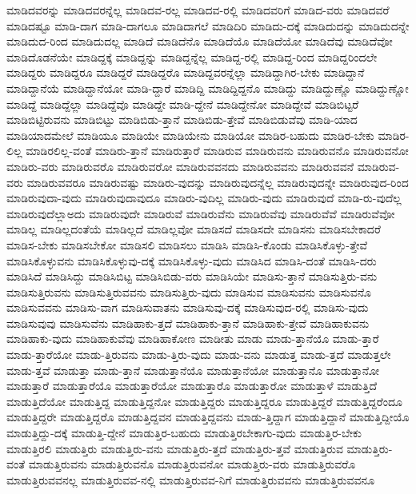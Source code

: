 {ಮಾಡಿದವರನ್ನು
ಮಾಡಿದವರನ್ನೆಲ್ಲ
ಮಾಡಿದವ-ರಲ್ಲ
ಮಾಡಿದವ-ರಲ್ಲಿ
ಮಾಡಿದವರಿಗೆ
ಮಾಡಿದ-ವರು
ಮಾಡಿದವರೆ
ಮಾಡಿದಷ್ಟೂ
ಮಾಡಿ-ದಾಗ
ಮಾಡಿ-ದಾಗಲೂ
ಮಾಡಿದಾಗಲೆ
ಮಾಡಿದಿರಿ
ಮಾಡಿದು-ದಕ್ಕೆ
ಮಾಡಿದುದನ್ನು
ಮಾಡಿದುದನ್ನೇ
ಮಾಡಿದುದ-ರಿಂದ
ಮಾಡಿದುದಲ್ಲ
ಮಾಡಿದೆ
ಮಾಡಿದೆನೊ
ಮಾಡಿದೆಯೊ
ಮಾಡಿದೆಯೋ
ಮಾಡಿದೆವು
ಮಾಡಿದೆವೋ
ಮಾಡಿದೊಡನೆಯೇ
ಮಾಡಿದ್ದಕ್ಕೆ
ಮಾಡಿದ್ದನ್ನು
ಮಾಡಿದ್ದನ್ನೆಲ್ಲ
ಮಾಡಿದ್ದ-ರಲ್ಲಿ
ಮಾಡಿದ್ದ-ರಿಂದ
ಮಾಡಿದ್ದರಿಂದಲೇ
ಮಾಡಿದ್ದರು
ಮಾಡಿದ್ದರೂ
ಮಾಡಿದ್ದರೆ
ಮಾಡಿದ್ದರೊ
ಮಾಡಿದ್ದವರನ್ನೆಲ್ಲಾ
ಮಾಡಿದ್ದಾಗಿರ-ಬೇಕು
ಮಾಡಿದ್ದಾನೆ
ಮಾಡಿದ್ದಾನೆಯೆ
ಮಾಡಿದ್ದಾನೆಯೋ
ಮಾಡಿ-ದ್ದಾರೆ
ಮಾಡಿದ್ದಿ
ಮಾಡಿದ್ದಿದ್ದನೊ
ಮಾಡಿದ್ದು
ಮಾಡಿದ್ದುಣ್ಣೊ
ಮಾಡಿದ್ದುಣ್ಣೋ
ಮಾಡಿದ್ದೆ
ಮಾಡಿದ್ದೆಲ್ಲಾ
ಮಾಡಿದ್ದೆವೊ
ಮಾಡಿದ್ದೇ
ಮಾಡಿ-ದ್ದೇನೆ
ಮಾಡಿದ್ದೇನೋ
ಮಾಡಿದ್ದೇವೆ
ಮಾಡಿಬಿಟ್ಟರೆ
ಮಾಡಿಬಿಟ್ಟಿರುವನು
ಮಾಡಿಬಿಟ್ಟು
ಮಾಡಿಬಿಡು-ತ್ತಾನೆ
ಮಾಡಿಬಿಡು-ತ್ತೇವೆ
ಮಾಡಿಬಿಡುವೆವು
ಮಾಡಿ-ಯಾದ
ಮಾಡಿಯಾದಮೇಲೆ
ಮಾಡಿಯೂ
ಮಾಡಿಯೇ
ಮಾಡಿಯೇನು
ಮಾಡಿಯೋ
ಮಾಡಿರ-ಬಹುದು
ಮಾಡಿರ-ಬೇಕು
ಮಾಡಿರ-ಲಿಲ್ಲ
ಮಾಡಿರಲಿಲ್ಲ-ವಂತೆ
ಮಾಡಿರು-ತ್ತಾನೆ
ಮಾಡಿರುತ್ತಾರೆ
ಮಾಡಿರುವ
ಮಾಡಿರುವನು
ಮಾಡಿರುವನೊ
ಮಾಡಿರುವನೋ
ಮಾಡಿರು-ವರು
ಮಾಡಿರುವರೊ
ಮಾಡಿರುವರೋ
ಮಾಡಿರುವವನದು
ಮಾಡಿರುವವನು
ಮಾಡಿರುವವನೆ
ಮಾಡಿರುವ-ವರು
ಮಾಡಿರುವವರೂ
ಮಾಡಿರುವಷ್ಟು
ಮಾಡಿರು-ವುದನ್ನು
ಮಾಡಿರುವುದನ್ನೆಲ್ಲ
ಮಾಡಿರುವುದನ್ನೇ
ಮಾಡಿರುವುದ-ರಿಂದ
ಮಾಡಿರುವುದಾ-ವುದು
ಮಾಡಿರುವುದಾವುದೂ
ಮಾಡಿರು-ವುದಿಲ್ಲ
ಮಾಡಿರು-ವುದು
ಮಾಡಿರುವುದೆ
ಮಾಡಿ-ರು-ವುದೆಲ್ಲ
ಮಾಡಿರುವುದೆಲ್ಲಾಅದು
ಮಾಡಿರುವುದೇ
ಮಾಡಿರುವೆ
ಮಾಡಿರುವೆನು
ಮಾಡಿರುವೆವು
ಮಾಡಿರುವೆವೆ
ಮಾಡಿರುವೆವೋ
ಮಾಡಿಲ್ಲ
ಮಾಡಿಲ್ಲದಂತೆಯೆ
ಮಾಡಿಲ್ಲದೆ
ಮಾಡಿಲ್ಲವೋ
ಮಾಡಿಸದೆ
ಮಾಡಿಸದೇ
ಮಾಡಿಸನು
ಮಾಡಿಸಬೇಕಾದರೆ
ಮಾಡಿಸ-ಬೇಕು
ಮಾಡಿಸಬೇಕೋ
ಮಾಡಿಸಲಿ
ಮಾಡಿಸಲು
ಮಾಡಿಸಿ
ಮಾಡಿಸಿ-ಕೊಂಡು
ಮಾಡಿಸಿಕೊಳ್ಳು-ತ್ತೇವೆ
ಮಾಡಿಸಿಕೊಳ್ಳುವನು
ಮಾಡಿಸಿಕೊಳ್ಳುವು-ದಕ್ಕೆ
ಮಾಡಿಸಿಕೊಳ್ಳು-ವುದು
ಮಾಡಿಸಿದ
ಮಾಡಿಸಿ-ದಂತೆ
ಮಾಡಿಸಿ-ದರು
ಮಾಡಿಸಿದೆ
ಮಾಡಿಸಿದ್ದು
ಮಾಡಿಸಿಬಿಟ್ಟ
ಮಾಡಿಸಿಬಿಡು-ವರು
ಮಾಡಿಸಿಯೇ
ಮಾಡಿಸು-ತ್ತಾನೆ
ಮಾಡಿಸುತ್ತಿರು-ವನು
ಮಾಡಿಸುತ್ತಿರುವನು
ಮಾಡಿಸುತ್ತಿರುವವನು
ಮಾಡಿಸುತ್ತಿರು-ವುದು
ಮಾಡಿಸುವ
ಮಾಡಿಸುವನು
ಮಾಡಿಸುವನೊ
ಮಾಡಿಸುವವನು
ಮಾಡಿಸು-ವಾಗ
ಮಾಡಿಸುವಾತನು
ಮಾಡಿಸುವು-ದಕ್ಕೆ
ಮಾಡಿಸುವುದ-ರಲ್ಲಿ
ಮಾಡಿಸು-ವುದು
ಮಾಡಿಸುವುವು
ಮಾಡಿಸುವೆನು
ಮಾಡಿಹಾಕು-ತ್ತದೆ
ಮಾಡಿಹಾಕು-ತ್ತಾನೆ
ಮಾಡಿಹಾಕು-ತ್ತೇವೆ
ಮಾಡಿಹಾಕುವನು
ಮಾಡಿಹಾಕು-ವುದು
ಮಾಡಿಹಾಕುವೆವು
ಮಾಡಿಹಾಕೋಣ
ಮಾಡೀತು
ಮಾಡು
ಮಾಡು-ತ್ತಾನೆಯೊ
ಮಾಡು-ತ್ತಾರೆ
ಮಾಡು-ತ್ತಾರೆಯೋ
ಮಾಡು-ತ್ತಿರುವನು
ಮಾಡು-ತ್ತಿರು-ವುದು
ಮಾಡು-ವನು
ಮಾಡುತ್ತ
ಮಾಡು-ತ್ತದೆ
ಮಾಡುತ್ತಲೇ
ಮಾಡು-ತ್ತವೆ
ಮಾಡುತ್ತಾ
ಮಾಡು-ತ್ತಾನೆ
ಮಾಡುತ್ತಾನೆಯೊ
ಮಾಡುತ್ತಾನೆಯೋ
ಮಾಡುತ್ತಾನೊ
ಮಾಡುತ್ತಾನೋ
ಮಾಡುತ್ತಾರೆ
ಮಾಡುತ್ತಾರೆಯೊ
ಮಾಡುತ್ತಾರೆಯೋ
ಮಾಡುತ್ತಾರೊ
ಮಾಡುತ್ತಾರೋ
ಮಾಡುತ್ತಾಳೆ
ಮಾಡುತ್ತಿದೆ
ಮಾಡುತ್ತಿದೆಯೋ
ಮಾಡುತ್ತಿದ್ದ
ಮಾಡುತ್ತಿದ್ದನೋ
ಮಾಡುತ್ತಿದ್ದರು
ಮಾಡುತ್ತಿದ್ದರೂ
ಮಾಡುತ್ತಿದ್ದರೆ
ಮಾಡುತ್ತಿದ್ದರೆಂದೂ
ಮಾಡುತ್ತಿದ್ದರೇ
ಮಾಡುತ್ತಿದ್ದರೊ
ಮಾಡುತ್ತಿದ್ದವನ
ಮಾಡುತ್ತಿದ್ದವನು
ಮಾಡು-ತ್ತಿದ್ದಾಗ
ಮಾಡುತ್ತಿದ್ದಾನೆ
ಮಾಡುತ್ತಿದ್ದೀಯೊ
ಮಾಡುತ್ತಿದ್ದು-ದಕ್ಕೆ
ಮಾಡುತ್ತಿ-ದ್ದೇನೆ
ಮಾಡುತ್ತಿರ-ಬಹುದು
ಮಾಡುತ್ತಿರಬೇಕಾಗು-ವುದು
ಮಾಡುತ್ತಿರ-ಬೇಕು
ಮಾಡುತ್ತಿರಲಿ
ಮಾಡುತ್ತಿರು
ಮಾಡುತ್ತಿರು-ವನು
ಮಾಡುತ್ತಿರು-ತ್ತದೆ
ಮಾಡುತ್ತಿರು-ತ್ತವೆ
ಮಾಡುತ್ತಿರುವ
ಮಾಡುತ್ತಿರು-ವಂತೆ
ಮಾಡುತ್ತಿರುವನು
ಮಾಡುತ್ತಿರುವನೊ
ಮಾಡುತ್ತಿರುವನೋ
ಮಾಡುತ್ತಿರು-ವರು
ಮಾಡುತ್ತಿರುವರೊ
ಮಾಡುತ್ತಿರುವವನಲ್ಲ
ಮಾಡುತ್ತಿರುವವ-ನಲ್ಲಿ
ಮಾಡುತ್ತಿರುವವ-ನಿಗೆ
ಮಾಡುತ್ತಿರುವವನು
ಮಾಡುತ್ತಿರುವವನೂ
}
